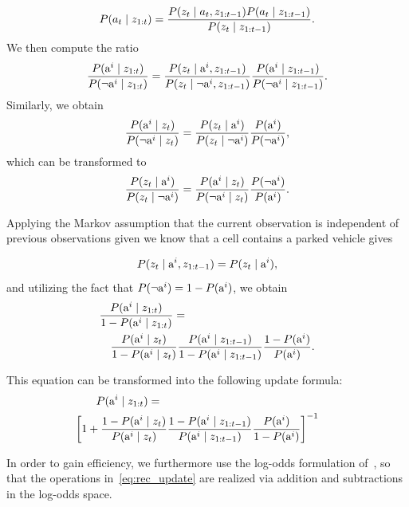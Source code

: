 \begin{equation}
P(a_t \mid  z_{1:t} ) = \frac{P(z_t \mid a_t, z_{1:t-1}) P(a_t \mid z_{1:t-1})}{P(z_t \mid z_{1:t-1})}.
\end{equation}
\noindent
We then compute the ratio
\begin{equation}
\frac{P({\mbox{a}^i}\mid z_{1:t})}{P(\neg{\mbox{a}^i} \mid z_{1:t})}
=
\frac{P(z_{t} \mid {\mbox{a}^i}, z_{1:t-1})}{P(z_{t} \mid \neg{\mbox{a}^i}, z_{1:t-1})}   \frac{P({\mbox{a}^i}\mid z_{1:t-1})}{ P(\neg{\mbox{a}^i}\mid z_{1:t-1})}.
\end{equation}
\noindent
Similarly, we obtain
\begin{equation}
\nonumber
\frac{P({\mbox{a}^i}\mid z_{t})}{P(\neg{\mbox{a}^i} \mid z_{t})} = \frac{P(z_{t} \mid {\mbox{a}^i})}{P(z_{t} \mid \neg{\mbox{a}^i})}   \frac{P({\mbox{a}^i})}{ P(\neg{\mbox{a}^i})},
\end{equation}
\noindent
which can be transformed to
\begin{equation}
\frac{P(z_{t} \mid {\mbox{a}^i})}{P(z_{t} \mid \neg{\mbox{a}^i})}
=
\frac{P({\mbox{a}^i} \mid z_{t})}{P(\neg{\mbox{a}^i} \mid z_{t})}   \frac{P(\neg{\mbox{a}^i})}{ P({\mbox{a}^i})}.
\end{equation}
\noindent

Applying the Markov assumption that the current observation is independent of
previous observations given we know that a cell contains a parked vehicle
gives

\begin{equation}
P(z_{t} \mid {\mbox{a}^i}, z_{1:t-1}) = P(z_{t} \mid {\mbox{a}^i}),
\end{equation}
\noindent
and utilizing the fact that $P(\neg {\mbox{a}^i}) = 1 - P({\mbox{a}^i})$, we obtain
\begin{eqnarray}
\lefteqn{\frac{ P(\v \mid z_{1:t}) }{ 1 - P(\v \mid z_{1:t})} = } \nonumber \\
&&\frac{ P( \v \mid \z)}{ 1 - P(\v \mid \z)}   \frac{ P(\v \mid \y)}{ 1 - P(\v \mid  \y)}   \frac{ 1 - P(\v)}{ P(\v)}.
\end{eqnarray}

\noindent
This equation can be transformed into the following update formula:
\begin{eqnarray}
\label{eq:rec_update}
\hspace{-6mm}\lefteqn{P(\v\mid z_{1:t})=} \nonumber \\
&& \hspace{-10mm} \left[ 1 + \frac{1 - P(\v\mid \z)}{P(\v \mid \z)}
\frac{1 - P(\v \mid \y)}{P(\v \mid \y)}   \frac{P(\v)}{1 - P(\v)}  \right]^{-1}
\end{eqnarray}
\noindent

In order to gain efficiency, we furthermore use the log-odds  formulation of~\citet{occupancy_grids}, so that the
operations in~\eqref{eq:rec_update} are realized via addition and
subtractions in the log-odds space.

